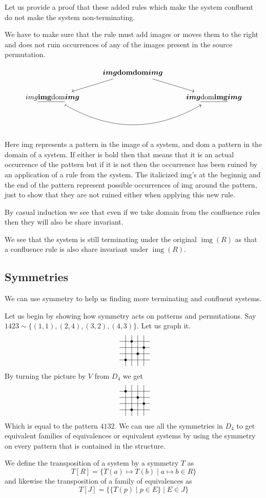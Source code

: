 \documentclass[a4paper, 11pt, english]{article}
\newcommand{\pattern}[4]{
  \raisebox{0.6ex}{
  \begin{tikzpicture}[scale=0.3, baseline=(current bounding box.center), #1]
    \foreach \x/\y in {#4}
      \fill[NE-lines] (\x,\y) rectangle +(1,1);
    \draw (0.01,0.01) grid (#2+0.99,#2+0.99);
    \foreach \x/\y in {#3}
      \filldraw (\x,\y) circle (5pt);
  \end{tikzpicture}}
}
\newcommand{\patternrule}{ \mapsto \!}
\theoremstyle{definition}
\DeclareMathOperator{\img}{img}
\begin{document}
Let us provide a proof that these added rules which make the system confluent do
not make the system non-terminating.
 
We have to make sure that the rule must add images or moves them to the right and does not ruin
occurrences of any of the images present in the source permutation.

\[
\begin{tikzcd}  
    & \bm{img}\mathbf{domdom}\bm{img} \arrow[dl] \arrow[dr] & \\
    img\underline{\mathbf{img}\mathrm{dom}}\bm{img} \arrow[bend
    right=30, mapsto]{rr} & & \bm{img}\underline{\mathrm{dom}\mathbf{img}}\bm{img}
\end{tikzcd}
\]

Here img represents a pattern in the image of a system, and dom a pattern in the domain of a system.
If either is bold then that means that it is an actual occurrence of the pattern but if it is not
then the occurrence has been ruined by an application of a rule from the system. The italicized
img's at the beginnig and the end of the pattern represent possible occurrences of img around the
pattern, just to show that they are not ruined either when applying this new rule.

By casual induction we see that even if we take domain from the confluence rules
then they will also be share invariant.

We see that the system is still terminating under the original $\img(R)$ as
that a confluence rule is also share invariant under $\img(R)$.

\subsection{Symmetries}
We can use symmetry to help us finding more terminating and confluent systems. 

Let us begin by showing how symmetry acts on patterns and permutations.
Say $1423 \sim \{(1,1), (2,4), (3,2), (4,3)\}$. Let us graph it.
\[
\pattern{}{4}{1/1, 2/4, 3/2, 4/3}{}
\]
By turning the picture by $V$ from $D_4$ we get
\[
\pattern{}{4}{1/4, 2/1, 3/3, 4/2}{}
\]
Which is equal to the pattern $4132$. 
We can use all the symmetries in $D_4$ to get equivalent families of equivalences or equivalent
systems by using the symmetry on every pattern that is contained in the structure.

We define the transposition of a system by a symmetry $T$ as
\begin{equation*}
  T[R] = \{T(a) \patternrule T(b) \mid a \patternrule b \in R \}
\end{equation*}
and likewise the transposition of a family of equivalences as
\begin{equation*}
  T[J] = \{ \{ T(p) \mid p \in E \} \mid E \in J \}
\end{equation*}
\end{document}
